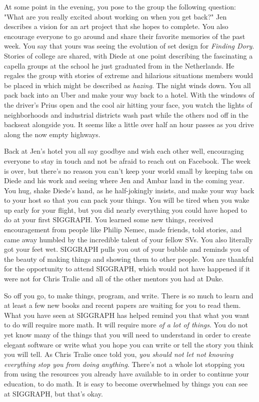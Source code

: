 \documentclass[../main.tex]{subfiles}
\begin{document}
At some point in the evening, you pose to the group the following question: "What are you really excited about working on when you get back?" Jen describes a vision for an art project that she hopes to complete. You also encourage everyone to go around and share their favorite memories of the past week. You say that yours was seeing the evolution of set design for \textit{Finding Dory}. Stories of college are shared, with Diede at one point describing the fascinating a capella groups at the school he just graduated from in the Netherlands. He regales the group with stories of extreme and hilarious situations members would be placed in which might be described as \textit{hazing}. The night winds down. You all pack back into an Uber and make your way back to a hotel. With the windows of the driver's Prius open and the cool air hitting your face, you watch the lights of neighborhoods and industrial districts wash past while the others nod off in the backseat alongside you. It seems like a little over half an hour passes as you drive along the now empty highways.

Back at Jen's hotel you all say goodbye and wish each other well, encouraging everyone to stay in touch and not be afraid to reach out on Facebook. The week is over, but there's no reason you can't keep your world small by keeping tabs on Diede and his work and seeing where Jen and Ambar land in the coming year. You hug, shake Diede's hand, as he half-jokingly insists, and make your way back to your host so that you can pack your things. You will be tired when you wake up early for your flight,  but you did nearly everything you could have hoped to do at your first SIGGRAPH. You learned some new things, received encouragement from people like Philip Nemec, made friends, told stories, and came away humbled by the incredible talent of your fellow SVs. You also literally got your feet wet. SIGGRAPH pulls you out of your bubble and reminds you of the beauty of making things and showing them to other people. You are thankful for the opportunity to attend SIGGRAPH, which would not have happened if it were not for Chris Tralie and all of the other mentors you had at Duke.

So off you go, to make things, program, and write. There is so much to learn and at least a few new books and recent papers are waiting for you to read them. What you have seen at SIGGRAPH has helped remind you that what you want to do will require more math. It will require more \textit{of a lot of things}. You do not yet know many of the things that you will need to understand in order to create elegant software or write what you hope you can write or tell the story you think you will tell. As Chris Tralie once told you, \textit{you should not let not knowing everything stop you from doing anything}. There's not a whole lot stopping you from using the resources you already have available to in order to continue your education, to do math. It is easy to become overwhelmed by things you can see at SIGGRAPH, but that's okay.
\end{document}
